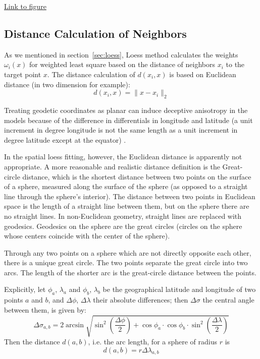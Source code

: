 \begin{framed}
\begin{center}
  \href{../plots/tmax.a1950.status.pdf}
  {Link to figure}
  \label{a1950.status}
\end{center}
\end{framed}

\subsection{Distance Calculation of Neighbors}

As we mentioned in section~\ref{sec:loess}, Loess method calculates the weights 
$\omega_i(x)$
for weighted least square based on the distance of neighbors $x_i$ to the target 
point $x$. The distance calculation of $d(x_i, x)$ is based on Euclidean distance 
(in two dimension for example):
$$
d(x_i, x) = \| x - x_i \|_2
$$

Treating geodetic coordinates as
planar can induce deceptive anisotropy in the models because
of the difference in differentials in longitude and latitude (a
unit increment in degree longitude is not the same length as
a unit increment in degree latitude except at the equator) \cite{banerjee2005geodetic}.

In the spatial loess fitting, however, the Euclidean distance is apparently not 
appropriate. A more reasonable and realistic distance definition is the Great-circle 
distance, which is the shortest distance between two points on the surface of a 
sphere, measured along the surface of the sphere (as opposed to a straight line 
through the sphere's interior). The distance between two points in Euclidean 
space is the length of a straight line between them, but on the sphere there are 
no straight lines. In non-Euclidean geometry, straight lines are replaced with 
geodesics. Geodesics on the sphere are the great circles (circles on the sphere 
whose centers coincide with the center of the sphere).

Through any two points on a sphere which are not directly opposite each other, 
there is a unique great circle. The two points separate the great circle into 
two arcs. The length of the shorter arc is the great-circle distance between the 
points\cite{greatcircle}.

Explicitly, let $\phi_a$, $\lambda_a$ and $\phi_b$, $\lambda_b$ be the geographical 
latitude and longitude of two points $a$ and $b$, and $\Delta \phi$, 
$\Delta \lambda$ their absolute differences; then $\Delta \sigma$ the central angle 
between them, is given by:
$$
\Delta \sigma_{a,b} = 2 \arcsin \sqrt{ \sin^2 ( \frac{\Delta \phi}{2} ) + \cos 
\phi_a \cdot \cos \phi_b \cdot \sin^2 ( \frac{\Delta \lambda}{2} )}
$$ 
Then the distance $d(a,b)$, i.e. the arc length, for a sphere of radius $r$ is
$$
d(a,b) = r \Delta \lambda_{a,b}
$$

